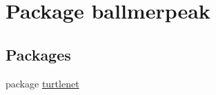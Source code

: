 \hypertarget{namespaceballmerpeak}{\section{Package ballmerpeak}
\label{namespaceballmerpeak}
}
\subsection*{Packages}
\begin{DoxyCompactItemize}
\item 
package \hyperlink{namespaceballmerpeak_1_1turtlenet}{turtlenet}
\end{DoxyCompactItemize}
